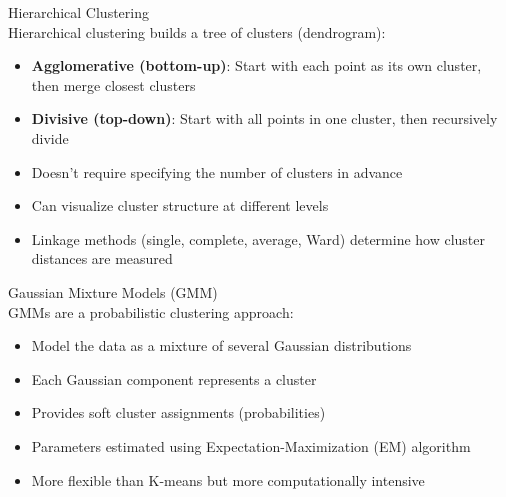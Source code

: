 \begin{concept}{Hierarchical Clustering}\\
Hierarchical clustering builds a tree of clusters (dendrogram):
\begin{itemize}
    \item \textbf{Agglomerative (bottom-up)}: Start with each point as its own cluster, then merge closest clusters
    \item \textbf{Divisive (top-down)}: Start with all points in one cluster, then recursively divide
    \item Doesn't require specifying the number of clusters in advance
    \item Can visualize cluster structure at different levels
    \item Linkage methods (single, complete, average, Ward) determine how cluster distances are measured
\end{itemize}
\end{concept}

\begin{concept}{Gaussian Mixture Models (GMM)}\\
GMMs are a probabilistic clustering approach:
\begin{itemize}
    \item Model the data as a mixture of several Gaussian distributions
    \item Each Gaussian component represents a cluster
    \item Provides soft cluster assignments (probabilities)
    \item Parameters estimated using Expectation-Maximization (EM) algorithm
    \item More flexible than K-means but more computationally intensive
\end{itemize}
\end{concept}

